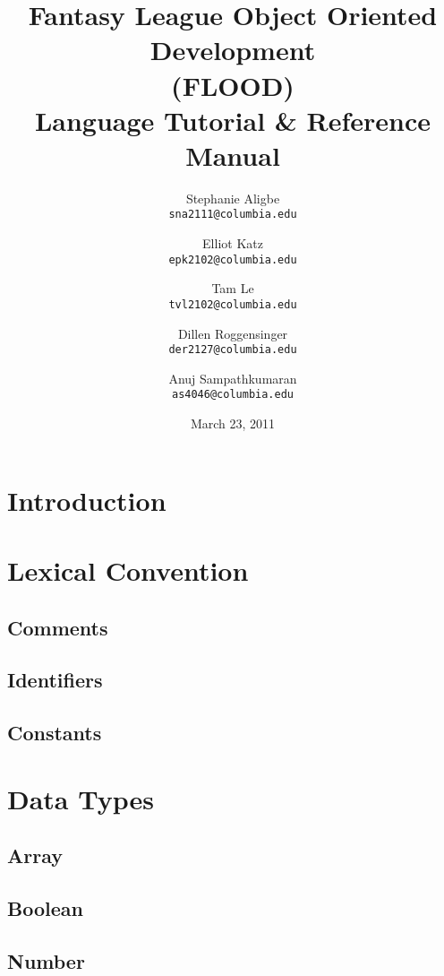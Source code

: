 \documentclass[12pt]{report}
\begin{document}
\title{
\textbf{Fantasy League Object Oriented Development}\\
\textbf{(FLOOD)}\\
{\Large Language Tutorial \& Reference Manual}
}
\author{
  Stephanie Aligbe\\
  \texttt{\small{sna2111@columbia.edu}}
  \and
  Elliot Katz\\
  \texttt{\small{epk2102@columbia.edu}}
  \and
  Tam Le\\
  \texttt{\small{tvl2102@columbia.edu}}
  \and
  Dillen Roggensinger\\
  \texttt{\small{der2127@columbia.edu}}
  \and
  Anuj Sampathkumaran\\
  \texttt{\small{as4046@columbia.edu}}
}
\date{March 23, 2011}
\maketitle
\tableofcontents

\chapter{Introduction}

\chapter{Lexical Convention}
\section{Comments}
\section{Identifiers}
\section{Constants}

\chapter{Data Types}
\section{Array}
\section{Boolean}
\section{Number}
\end{document}
